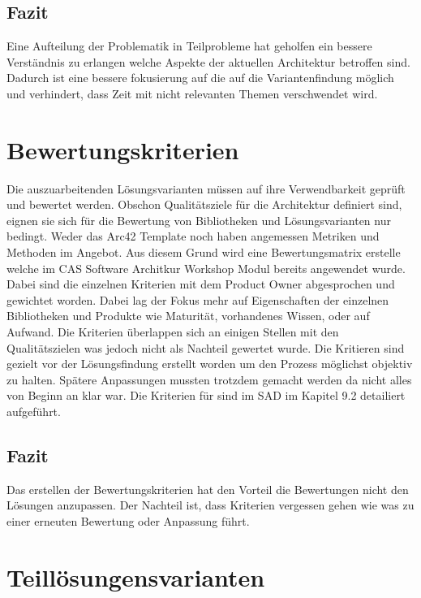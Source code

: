 \subsection{Fazit}

Eine Aufteilung der Problematik in Teilprobleme hat geholfen ein bessere Verständnis zu erlangen welche Aspekte der aktuellen Architektur betroffen sind. Dadurch ist eine bessere fokusierung auf die auf die Variantenfindung möglich und verhindert, dass Zeit mit nicht relevanten Themen verschwendet wird.

\section{Bewertungskriterien}

Die auszuarbeitenden Lösungsvarianten müssen auf ihre Verwendbarkeit geprüft und bewertet werden. Obschon Qualitätsziele für die Architektur definiert sind, eignen sie sich für die Bewertung von Bibliotheken und Lösungsvarianten nur bedingt. Weder das Arc42 Template noch \cite{esa} haben angemessen Metriken und Methoden im Angebot. Aus diesem Grund wird eine Bewertungsmatrix erstelle welche im CAS Software Architkur Workshop Modul bereits angewendet wurde. Dabei sind die einzelnen Kriterien mit dem Product Owner abgesprochen und gewichtet worden. Dabei lag der Fokus mehr auf Eigenschaften der einzelnen Bibliotheken und Produkte wie Maturität, vorhandenes Wissen, oder auf Aufwand. Die Kriterien überlappen sich an einigen Stellen mit den Qualitätszielen was jedoch nicht als Nachteil gewertet wurde. Die Kritieren sind gezielt vor der Lösungsfindung erstellt worden um den Prozess möglichst objektiv zu halten. Spätere Anpassungen mussten trotzdem gemacht werden da nicht alles von Beginn an klar war. Die Kriterien für sind im SAD im Kapitel 9.2 detailiert aufgeführt.

\subsection{Fazit}

Das erstellen der Bewertungskriterien hat den Vorteil die Bewertungen nicht den Lösungen anzupassen. Der Nachteil ist, dass Kriterien vergessen gehen wie was zu einer erneuten Bewertung oder Anpassung führt.


\section{Teillösungensvarianten}

